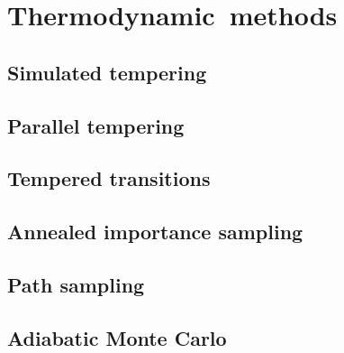 \chapter{\mbox{Thermodynamic methods}}\label{ch:thermodynamic-methods}

\section{Simulated tempering}

\section{Parallel tempering}

\section{Tempered transitions}

\section{Annealed importance sampling}

\section{Path sampling}

\section{Adiabatic Monte Carlo}